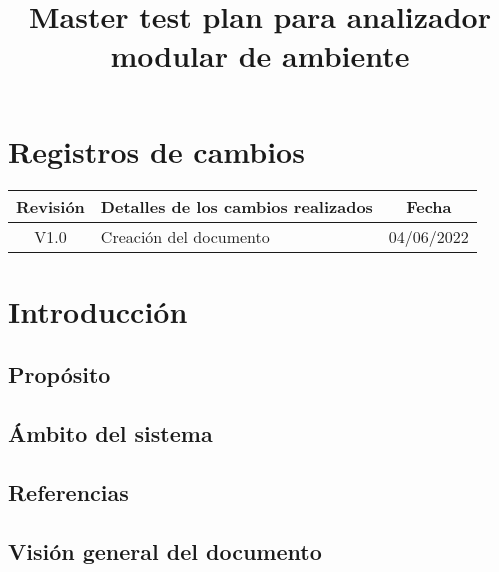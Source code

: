 \documentclass[12pt,a4paper, twosite]{article}
\date{}
\title{Master test plan para analizador modular de ambiente}
\begin{document}
\maketitle
\tableofcontents

\newpage

\section*{Registros de cambios}
\label{sec:registro}

\begin{table}[ht]
    \label{tab:registro}
    \centering
    \begin{tabularx}{\linewidth}{@{}|c|X|c|@{}}
        \hline
        \bf Revisión & \multicolumn{1}{c|}{\bf Detalles de los cambios realizados} &
        \bf Fecha                                                                               \\ \hline
        V1.0         & Creación del documento                                      & 04/06/2022
        \\
        \hline
    \end{tabularx}
\end{table}

\pagebreak

\section{Introducción}

\subsection{Propósito}

\subsection{Ámbito del sistema}

\subsection{Referencias}

\subsection{Visión general del documento}
\end{document}
